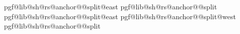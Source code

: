{{{                            }%
                            \expandafter\pgfextract@process\csname pgf@lib@sh@rs@anchor@\pgf@lib@sh@rs@number @split@east\endcsname{%
                                \northeast%
                                \pgf@y=\pgf@ya%
                            }%
                            \expandafter\pgfextract@process\csname pgf@lib@sh@rs@anchor@\pgf@lib@sh@rs@number @split\endcsname{%
                                \centerpoint%
                                \pgf@y=\pgf@ya%
                            }%
                            \expandafter\addtosavedmacro\csname pgf@lib@sh@rs@anchor@\pgf@lib@sh@rs@number @split@east\endcsname%
                            \expandafter\addtosavedmacro\csname pgf@lib@sh@rs@anchor@\pgf@lib@sh@rs@number @split@west\endcsname%
                            \expandafter\addtosavedmacro\csname pgf@lib@sh@rs@anchor@\pgf@lib@sh@rs@number @split\endcsname%
                        \fi%
                    \fi%
            \repeatpgfmathloop%
        \fi%
    }%
    \savedanchor\basepoint{%
        \pgf@x=0.5\wd\pgfnodeparttextbox%
        \pgf@y=0pt\relax%
    }%
    \savedanchor\midpoint{%
        \pgf@x=0.5\wd\pgfnodeparttextbox%
        \pgfmathsetlength\pgf@y{+0.5ex}%
    }%
    }
